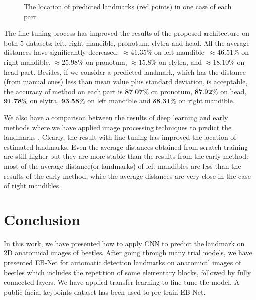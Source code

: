 \documentclass[review]{elsarticle}
\begin{document}
\begin{figure}[htbp]
    \caption{The location of predicted landmarks (red points) in one case of each part }
    \label{figpdl}
\end{figure}

The fine-tuning process has improved the results of the proposed architecture on both $5$ datasets: left, right mandible, pronotum, elytra and head. All the average distances have significantly decreased: $\approx 41.35\%$ on left mandible, $\approx 46.51\%$ on right mandible, $\approx 25.98\%$ on pronotum, $\approx 15.8\%$ on elytra, and $\approx 18.10\%$  on head part. Besides, if we consider a predicted landmark, which has the distance (from manual ones) less than mean value plus standard deviation, is acceptable, the accuracy of method on each part is $\textbf{87.07\%}$ on pronotum, $\textbf{87.92\%}$ on head, $\textbf{91.78\%}$ on elytra, $\textbf{93.58\%}$ on left mandible and $\textbf{88.31\%}$ on right mandible.

We also have a comparison between the results of deep learning and early methods where we have applied image processing techniques to predict the landmarks \cite{le2017maelab}. Clearly, the result with fine-tuning has improved the location of estimated landmarks. Even the average distances obtained from scratch training are still higher but they are more stable than the results from the early method: most of the average distance(or landmarks) of left mandibles are less than the results of the early method, while the average distances are very close in the case of right mandibles.
\section{Conclusion}
\label{sconclusion}
In this work, we have presented how to apply CNN to predict the landmark on 2D anatomical images of beetles. After going through many trial models, we have presented EB-Net for automatic detection landmarks on anatomical images of beetles which includes the repetition of some elementary blocks, followed by fully connected layers. We have applied transfer learning to fine-tune the model. A public facial keypoints dataset has been used to pre-train EB-Net.
\end{document}
